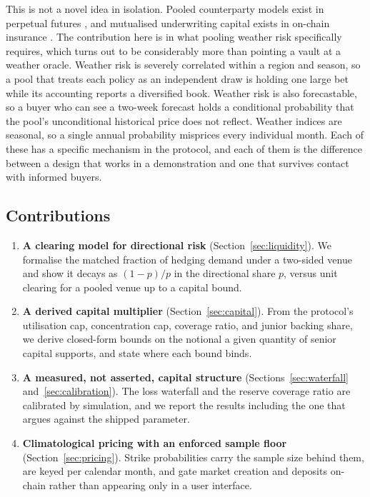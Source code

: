 \documentclass[11pt,a4paper]{article}
\begin{document}
This is not a novel idea in isolation. Pooled counterparty models exist in perpetual futures
\cite{perp_protocol, gmx_docs}, and mutualised underwriting capital exists in on-chain
insurance \cite{nexus_mutual}. The contribution here is in what pooling weather risk
specifically requires, which turns out to be considerably more than pointing a vault at a
weather oracle. Weather risk is severely correlated within a region and season, so a pool
that treats each policy as an independent draw is holding one large bet while its accounting
reports a diversified book. Weather risk is also forecastable, so a buyer who can see a
two-week forecast holds a conditional probability that the pool's unconditional historical
price does not reflect. Weather indices are seasonal, so a single annual probability
misprices every individual month. Each of these has a specific mechanism in the protocol,
and each of them is the difference between a design that works in a demonstration and one
that survives contact with informed buyers.

\subsection{Contributions}

\begin{enumerate}[leftmargin=1.4em,itemsep=3pt]
\item \textbf{A clearing model for directional risk} (Section~\ref{sec:liquidity}). We
formalise the matched fraction of hedging demand under a two-sided venue and show it decays
as $(1-p)/p$ in the directional share $p$, versus unit clearing for a pooled venue up to a
capital bound.

\item \textbf{A derived capital multiplier} (Section~\ref{sec:capital}). From the protocol's
utilisation cap, concentration cap, coverage ratio, and junior backing share, we derive
closed-form bounds on the notional a given quantity of senior capital supports, and state
where each bound binds.

\item \textbf{A measured, not asserted, capital structure} (Sections~\ref{sec:waterfall}
and~\ref{sec:calibration}). The loss waterfall and the reserve coverage ratio are calibrated
by simulation, and we report the results including the one that argues against the shipped
parameter.

\item \textbf{Climatological pricing with an enforced sample floor}
(Section~\ref{sec:pricing}). Strike probabilities carry the sample size behind them, are
keyed per calendar month, and gate market creation and deposits on-chain rather than
appearing only in a user interface.
\end{enumerate}
\end{document}
